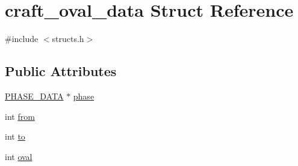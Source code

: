 \hypertarget{structcraft__oval__data}{\section{craft\-\_\-oval\-\_\-data Struct Reference}
\label{structcraft__oval__data}
}


{\ttfamily \#include $<$structs.\-h$>$}

\subsection*{Public Attributes}
\begin{DoxyCompactItemize}
\item 
\hyperlink{structs_8h_a946fd03f2da414ee020673d226fbae22}{P\-H\-A\-S\-E\-\_\-\-D\-A\-T\-A} $\ast$ \hyperlink{structcraft__oval__data_a01211725720787294fae38e5878c7843}{phase}
\item 
int \hyperlink{structcraft__oval__data_a0ec182de9ea4e17a26deb92c6f745b48}{from}
\item 
int \hyperlink{structcraft__oval__data_af57864756ca7e54ebf24ad0ccd8b3a76}{to}
\item 
int \hyperlink{structcraft__oval__data_a067c353bf4cecbdf85c47dcb8064a8e7}{oval}
\end{DoxyCompactItemize}


